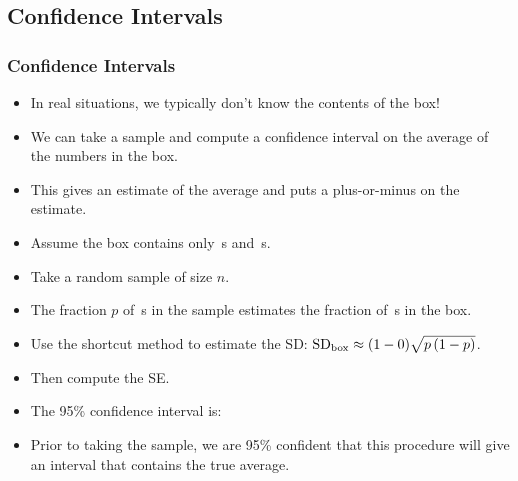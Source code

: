 \documentclass[t]{beamer}
\begin{document}
\subsection{Confidence Intervals}
\begin{frame}
\frametitle{Confidence Intervals}

\footnotesize
\begin{itemize}
\item In real situations, we typically don't know the contents of the box!
\item<2-> We can take a sample and  compute a {\color{blue}confidence 
   interval} on the average of the numbers in the box.
\item<3-> This gives an estimate of the average and puts a plus-or-minus on the estimate.
\vspace{-15pt}
\end{itemize}


\begin{itemize}
\item<4-> Assume the box contains only  \,s
  and \,s.
\item<5-> Take a random sample of size $n$.
\item<6-> The fraction $p$ of \,s in the sample 
    estimates the fraction of \,s in the box.
\item<7-> Use the shortcut method to estimate the SD:
   $\mbox{SD}_{\mbox{\scriptsize box}}\approx (1-0)\sqrt{p\,(1-p)}$.
\item<8-> Then compute the SE.
\item<9-> The 95\% confidence interval is:\vspace{-15pt}
\end{itemize}

\vspace{-8pt}

\begin{itemize}
\item<10-> \color{darkgreen} 
  Prior to taking the sample, we are 95\% confident that this procedure will 
   give an interval that contains the true average.
\end{itemize}

\end{frame}
\end{document}
